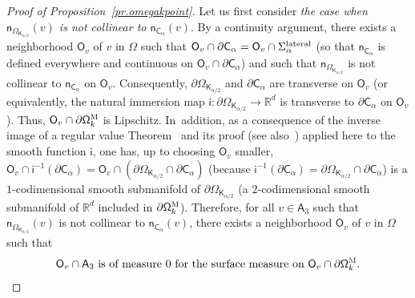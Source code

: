 \documentclass[10pt]{amsart}
\let\pa\partial
\theoremstyle{plain}
\theoremstyle{definition}
\begin{document}
\begin{proof}[Proof of Proposition~\ref{pr.omegakpoint}]
Let us first consider \emph{the case when $\mathsf n_{\Omega_{\mathsf K_{\alpha/2}}}(v)$ is not collinear to $\mathsf n_{\mathsf C_\alpha}(v)$}. By a continuity argument, there exists a neighborhood $\mathsf O_v$ of $v$ in $\Omega$ such that $\mathsf O_v\cap \pa \mathsf C_\alpha=\mathsf O_v\cap \Sigma_\alpha^{\textup{lateral}}$ (so that $\mathsf n_{\mathsf C_\alpha}$ is defined everywhere and continuous on $\mathsf O_v\cap \pa \mathsf C_\alpha$) and such that $\mathsf n_{\Omega_{\mathsf K_{\alpha/2}}}$ is not collinear to $\mathsf n_{\mathsf C_\alpha}$ on $\mathsf O_v$. Consequently, $ \partial \Omega_{\mathsf K_{\alpha/2}}$ and $ \pa \mathsf C_\alpha$ are transverse on $\mathsf O_v$ (or equivalently, the natural immersion map $\mathsf i: \partial \Omega_{\mathsf K_{\alpha/2}}\to \mathbb R^d$ is transverse to $ \pa \mathsf C_\alpha$ on $\mathsf O_v$). Thus, $\mathsf O_v\cap \pa \mathsf \Omega_k^{\textsc{M}}$ is Lipschitz. In~addition, as a consequence of the inverse image of a regular value Theorem~\cite[Th.\,(5.12)]{brocker1982introduction} and its proof (see also~\cite{thom1954quelques,milnor1997topology,guillemin2010differential})
applied here to the smooth function $\mathsf i$, one has, up to choosing $\mathsf O_v$ smaller, $\mathsf O_v \cap \mathsf i^{-1}(\pa \mathsf C_\alpha)= \mathsf O_v\cap (\partial \Omega_{\mathsf K_{\alpha/2}}\cap \pa \mathsf C_\alpha)$ (because $\mathsf i^{-1}(\pa \mathsf C_\alpha)= \partial \Omega_{\mathsf K_{\alpha/2}}\cap \pa \mathsf C_\alpha$) is a $1$-codimensional smooth submanifold of $\partial \Omega_{\mathsf K_{\alpha/2}}$ (\ie a $2$-codimensional smooth submanifold of $\mathbb R^d$ included in $\pa \mathsf \Omega_k^{\textsc{M}}$).
Therefore, for all $v\in \mathsf A_3$ such that $\mathsf n_{\Omega_{\mathsf K_{\alpha/2}}}(v)$ is not collinear to $\mathsf n_{\mathsf C_\alpha}(v)$, there exists a neighborhood $\mathsf O_v$ of $v$ in $\Omega$ such that
\begin{equation}\label{eq.point1A3}
\text{$\mathsf O_v\cap \mathsf A_3$ is of measure $0$ for the surface measure on $\mathsf O_v\cap \pa \mathsf \Omega_k^{\textsc{M}}$}.
\end{equation}


\end{proof}
\end{document}
